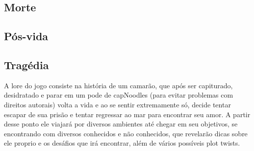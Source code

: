     \subsection{Morte}%
    \subsection{Pós-vida}%
    \subsection{Tragédia}%


A lore do jogo consiste na história de um camarão, que após ser capiturado, desidratado e parar em um pode de capNoodles (para evitar problemas com direitos autorais) volta a vida e ao se sentir extremamente só, decide tentar escapar de sua prisão e tentar regressar ao mar para encontrar seu amor. A partir desse ponto ele viajará por diversos ambientes até chegar em seu objetivos, se encontrando com diversos conhecidos e não conhecidos, que revelarão dicas sobre ele proprio e os desáfios que irá encontrar, além de vários possíveis plot twists.
